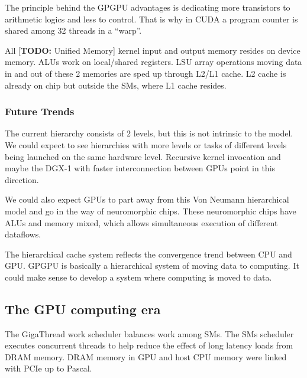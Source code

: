 The principle behind the GPGPU advantages is dedicating more transistors to arithmetic logics and less to control.
That is why in CUDA a program counter is shared among 32 threads in a ``warp''.

All [\textbf{TODO:} Unified Memory] kernel input and output memory resides on device memory.
ALUs work on local/shared registers.
LSU array operations moving data in and out of these 2 memories are sped up through L2/L1 cache.
L2 cache is already on chip but outside the SMs, where L1 cache resides.

\subsubsection{Future Trends}

The current hierarchy consists of 2 levels, but this is not intrinsic to the model.
We could expect to see hierarchies with more levels or tasks of different levels being launched on the same hardware level.
Recursive kernel invocation and maybe the DGX-1 with faster interconnection between GPUs point in this direction.

We could also expect GPUs to part away from this Von Neumann hierarchical model and go in the way of neuromorphic chips.
These neuromorphic chips have ALUs and memory mixed, which allows simultaneous execution of different dataflows.

The hierarchical cache system reflects the convergence trend between CPU and GPU.
GPGPU is basically a hierarchical system of moving data to computing.
It could make sense to develop a system where computing is moved to data.

\subsection{The GPU computing era \cite{nickolls2010gpu}}

The GigaThread work scheduler balances work among SMs.
The SMs scheduler executes concurrent threads to help reduce the effect of long latency loads from DRAM memory.
DRAM memory in GPU and host CPU memory were linked with PCIe up to Pascal.


%

